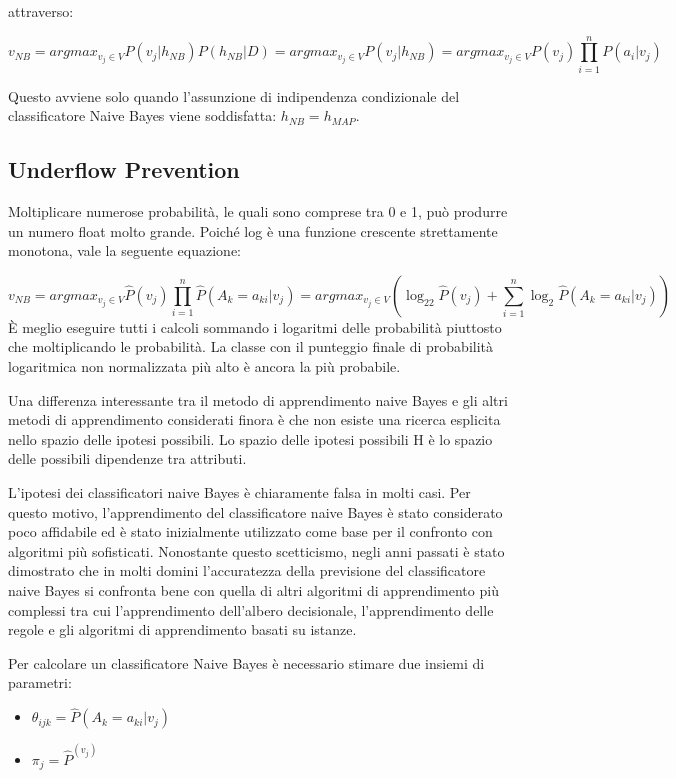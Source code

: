 \documentclass[a4paper]{extarticle}
\begin{document}
attraverso: 

\begin{equation*}
v_{NB} = argmax_{v_j \in V} P(v_j | h_{NB})P(h_{NB} | D) = argmax_{v_j \in V} P(v_j | h_{NB}) = argmax_{v_j \in V} P(v_j)  \prod_{i=1}^n P(a_i | v_j)
\end{equation*}

Questo avviene solo  quando l'assunzione di indipendenza condizionale del classificatore Naive Bayes viene soddisfatta: $h_{NB} = h_{MAP}$. 

\subsection{Underflow Prevention}
Moltiplicare numerose probabilità, le quali sono comprese tra 0 e 1, può produrre un numero float molto grande. Poiché log è una funzione crescente strettamente monotona, vale la seguente equazione:

\begin{equation*}
v_{NB} = argmax_{v_j \in V} \hat P (v_j) \prod_{i=1}^n \hat P (A_k = a_{ki} | v_j) = argmax_{v_j \in V} (\log_22 \hat P(v_j) + \sum\limits_{i=1}^n \log_2 \hat P (A_k = a_{ki} | v_j))
\end{equation*}
È meglio eseguire tutti i calcoli sommando i logaritmi delle probabilità piuttosto che moltiplicando le probabilità. La classe con il punteggio finale di probabilità logaritmica non normalizzata più alto è ancora la più probabile.

Una differenza interessante tra il metodo di apprendimento naive Bayes e gli altri metodi di apprendimento considerati finora è che non esiste una ricerca esplicita nello spazio delle ipotesi possibili. Lo spazio delle ipotesi possibili H è lo spazio delle possibili dipendenze tra attributi. 

L’ipotesi dei classificatori naive Bayes è chiaramente falsa in molti casi. Per questo motivo, l'apprendimento del classificatore naive Bayes è stato considerato poco affidabile ed è stato inizialmente utilizzato come base per il confronto con algoritmi più sofisticati. Nonostante questo scetticismo, negli anni passati è stato dimostrato che in molti domini l’accuratezza della previsione del classificatore naive Bayes si confronta bene con quella di altri algoritmi di apprendimento più complessi tra cui l’apprendimento dell’albero decisionale, l’apprendimento delle regole e gli algoritmi di apprendimento basati su istanze.

Per calcolare un classificatore Naive Bayes è necessario stimare due insiemi di parametri:
\begin{itemize}
\item $\theta_{ijk} = \hat P (A_k = a_{ki} | v_j)$
\item $\pi_j = \hat P ^(v_j)$
\end{itemize}
\end{document}

